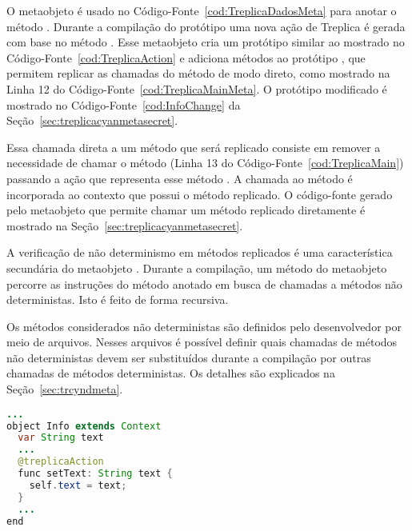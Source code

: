 O metaobjeto  é usado no Código-Fonte~\ref{cod:TreplicaDadosMeta} para anotar o método . Durante a compilação do protótipo  uma nova ação de Treplica é gerada com base no método . Esse metaobjeto cria um protótipo similar ao mostrado no Código-Fonte~\ref{cod:TreplicaAction} e adiciona métodos ao protótipo , que permitem replicar as chamadas do método  de modo direto, como mostrado na Linha 12 do Código-Fonte~\ref{cod:TreplicaMainMeta}. O protótipo  modificado é mostrado no Código-Fonte~\ref{cod:InfoChange} da Seção~\ref{sec:treplicacyanmetasecret}.

Essa chamada direta a um método que será replicado consiste em remover a necessidade de chamar o método  (Linha 13 do Código-Fonte~\ref{cod:TreplicaMain}) passando a ação que representa esse método . A chamada ao método  é incorporada ao contexto que possui o método replicado. O código-fonte gerado pelo metaobjeto que permite chamar um método replicado diretamente é mostrado na Seção~\ref{sec:treplicacyanmetasecret}.

A verificação de não determinismo em métodos replicados é uma característica secundária do metaobjeto . Durante a compilação, um método do metaobjeto percorre as instruções do método anotado em busca de chamadas a métodos  não deterministas. Isto é feito de forma recursiva.

Os métodos considerados não deterministas são definidos pelo desenvolvedor por meio de arquivos. Nesses arquivos é possível definir quais chamadas de métodos não deterministas devem ser substituídos durante a compilação por outras chamadas de métodos deterministas. Os detalhes são explicados na Seção~\ref{sec:trcyndmeta}.

\begin{lstlisting}[language=Java, caption={\textbf{Action} usando Metaobjeto}, label={cod:TreplicaDadosMeta},float]
...  
object Info extends Context
  var String text
  ...
  @treplicaAction
  func setText: String text {
    self.text = text;
  }
  ...
end
\end{lstlisting}

